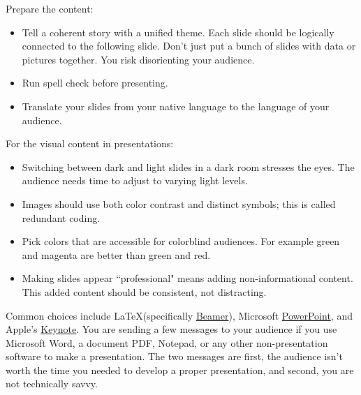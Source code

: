 
Prepare the content:
\begin{itemize}
    \item Tell a coherent story with a unified theme. Each slide should be logically connected to the following slide. Don't just put a bunch of slides with data or pictures together. You risk disorienting your audience.
    \item Run spell check before presenting.
    \item Translate your slides from your native language to the language of your audience.
\end{itemize}


For the visual content in presentations:
\begin{itemize}
    \item Switching between dark and light slides in a dark room stresses the eyes. The audience needs time to adjust to varying light levels.
    \item Images should use both color contrast and distinct symbols; this is called redundant coding. 
    \item Pick colors that are accessible for colorblind audiences. For example green and magenta are better than green and red. 
    \item Making slides appear ``professional" means adding non-informational content. This added content should be consistent, not distracting.
\end{itemize}

Common choices include \LaTeX (specifically \href{https://en.wikipedia.org/wiki/Beamer_(LaTeX)}{Beamer}), 
\iftoggle{WPinmargin}{\marginpar{$>$Wikipedia: Beamer}}{}
Microsoft \href{https://en.wikipedia.org/wiki/Microsoft_PowerPoint}{PowerPoint}, 
and Apple's \href{https://en.wikipedia.org/wiki/Keynote_(presentation_software)}{Keynote}. 
You are sending a few messages to your audience if you use Microsoft Word, a document PDF, Notepad, or any other non-presentation software to make a presentation.
The two messages are first, the audience isn't worth the time you needed to develop a proper presentation, and second, you are not technically savvy.

